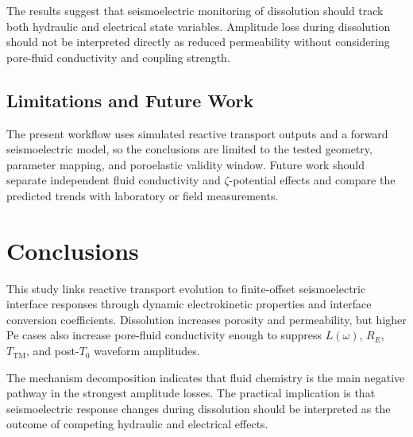 \documentclass[draft]{agujournal2019}
\begin{document}
The results suggest that seismoelectric monitoring of dissolution should track both hydraulic and electrical state variables.
Amplitude loss during dissolution should not be interpreted directly as reduced permeability without considering pore-fluid conductivity and coupling strength.

\subsection{Limitations and Future Work}

The present workflow uses simulated reactive transport outputs and a forward seismoelectric model, so the conclusions are limited to the tested geometry, parameter mapping, and poroelastic validity window.
Future work should separate independent fluid conductivity and $\zeta$-potential effects and compare the predicted trends with laboratory or field measurements.

\section{Conclusions}

This study links reactive transport evolution to finite-offset seismoelectric interface responses through dynamic electrokinetic properties and interface conversion coefficients.
Dissolution increases porosity and permeability, but higher Pe cases also increase pore-fluid conductivity enough to suppress $L(\omega)$, $R_E$, $T_{\mathrm{TM}}$, and post-$T_0$ waveform amplitudes.

The mechanism decomposition indicates that fluid chemistry is the main negative pathway in the strongest amplitude losses.
The practical implication is that seismoelectric response changes during dissolution should be interpreted as the outcome of competing hydraulic and electrical effects.






%
%
\end{document}
